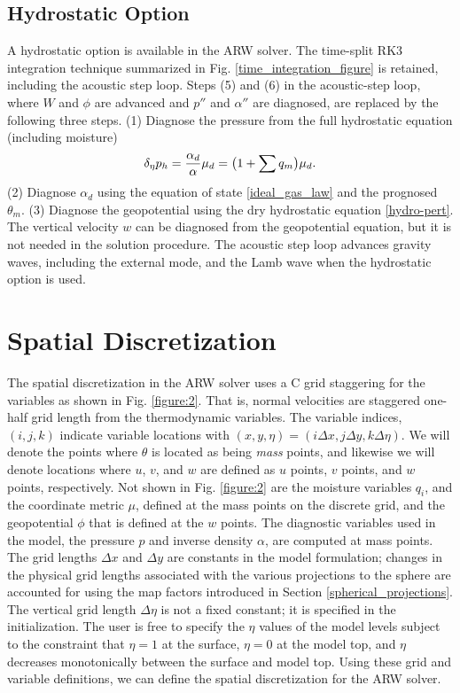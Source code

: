 \subsection{Hydrostatic Option}

A hydrostatic option is available in the ARW solver.  The time-split RK3
integration technique summarized  in Fig. \ref{time_integration_figure}
is retained, including the acoustic
step loop.  Steps (5) and (6) in the acoustic-step loop,  where
$W$ and $\phi$ are advanced and $p''$ and $\alpha''$ are diagnosed, are 
replaced by the following three steps.  
(1) Diagnose the pressure from the full hydrostatic equation (including moisture)
%
\begin{equation}
\delta_\eta p_h = {\alpha_d \over \alpha} \mu_d = \bigl(1 + \sum q_m \bigr)\mu_d.
\notag
\end{equation}
%
\noindent
(2) Diagnose $\alpha_d$ using
the equation of state \eqref{ideal_gas_law}
and the prognosed $\theta_m$.
(3) Diagnose
the geopotential using the dry hydrostatic equation \eqref{hydro-pert}.
The vertical velocity
$w$ can be diagnosed from the geopotential equation, but it is not needed
in the solution procedure.  The acoustic step loop advances gravity waves,
including the external mode, and the Lamb wave 
when the hydrostatic option is used.

\section{Spatial Discretization}

The spatial discretization in the ARW solver uses a C grid staggering for
the variables as shown in Fig. \ref{figure:2}.  That is, normal
velocities are staggered one-half grid length from the thermodynamic
variables.  The variable indices, $(i,j,k)$ 
indicate variable locations with
$(x,y,\eta) = (i\Delta x, j\Delta y, k \Delta \eta)$.  We will denote
the points where $\theta$ is located as being {\it mass} points, and
likewise we will denote locations where $u$, $v$, and $w$ are defined as
$u$ points, $v$ points, and $w$ points, respectively.  Not shown in Fig.
\ref{figure:2} are the moisture 
variables $q_i$, and the coordinate metric $\mu$, defined at the
mass points on the discrete grid, and the geopotential $\phi$ that is
defined at the $w$ points.  The diagnostic variables used in the model, the
pressure $p$ and inverse density $\alpha$, are computed at mass points.
The grid lengths $\Delta x$ and $\Delta y$ are constants in the model
formulation; changes in the physical grid lengths associated with the
various projections to the sphere are accounted for using the map
factors introduced in Section \ref{spherical_projections}.  The vertical
grid length $\Delta \eta$ is not a fixed constant; it is specified in
the initialization.  The user is free to specify the $\eta$ values of the
model levels subject to the constraint that $\eta = 1$ at the surface,
$\eta = 0$ at the model top, and $\eta$ decreases monotonically between
the surface and model top.  Using these grid and variable definitions,
we can define the spatial discretization for the ARW solver.

